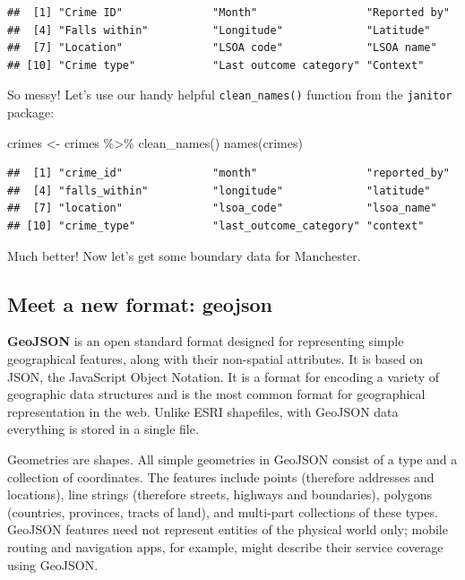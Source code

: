 \documentclass[
]{book}
\newenvironment{Shaded}{\begin{snugshade}}{\end{snugshade}}
\newcommand{\FunctionTok}[1]{\textcolor[rgb]{0.00,0.00,0.00}{#1}}
\newcommand{\NormalTok}[1]{#1}
\newcommand{\OtherTok}[1]{\textcolor[rgb]{0.56,0.35,0.01}{#1}}
\newcommand{\SpecialCharTok}[1]{\textcolor[rgb]{0.00,0.00,0.00}{#1}}
\begin{document}
\begin{verbatim}
##  [1] "Crime ID"              "Month"                 "Reported by"          
##  [4] "Falls within"          "Longitude"             "Latitude"             
##  [7] "Location"              "LSOA code"             "LSOA name"            
## [10] "Crime type"            "Last outcome category" "Context"
\end{verbatim}

So messy! Let's use our handy helpful \texttt{clean\_names()} function from the \texttt{janitor} package:

\begin{Shaded}
\begin{Highlighting}[]
\NormalTok{crimes }\OtherTok{\textless{}{-}}\NormalTok{ crimes }\SpecialCharTok{\%\textgreater{}\%} \FunctionTok{clean\_names}\NormalTok{()}
\FunctionTok{names}\NormalTok{(crimes)}
\end{Highlighting}
\end{Shaded}

\begin{verbatim}
##  [1] "crime_id"              "month"                 "reported_by"          
##  [4] "falls_within"          "longitude"             "latitude"             
##  [7] "location"              "lsoa_code"             "lsoa_name"            
## [10] "crime_type"            "last_outcome_category" "context"
\end{verbatim}

Much better! Now let's get some boundary data for Manchester.

\hypertarget{meet-a-new-format-geojson}{%
\subsection{Meet a new format: geojson}\label{meet-a-new-format-geojson}}

\textbf{GeoJSON} is an open standard format designed for representing simple geographical features, along with their non-spatial attributes. It is based on JSON, the JavaScript Object Notation. It is a format for encoding a variety of geographic data structures and is the most common format for geographical representation in the web. Unlike ESRI shapefiles, with GeoJSON data everything is stored in a single file.

Geometries are shapes. All simple geometries in GeoJSON consist of a type and a collection of coordinates. The features include points (therefore addresses and locations), line strings (therefore streets, highways and boundaries), polygons (countries, provinces, tracts of land), and multi-part collections of these types. GeoJSON features need not represent entities of the physical world only; mobile routing and navigation apps, for example, might describe their service coverage using GeoJSON.
\end{document}
